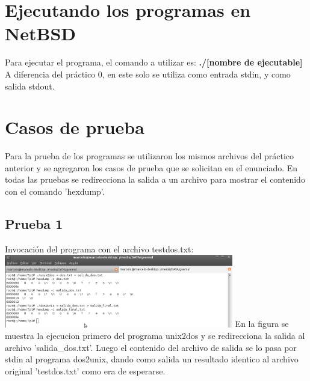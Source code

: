 \documentclass[a4paper,10pt]{article}
\begin{document}
\section{Ejecutando los programas en NetBSD}
  Para ejecutar el programa, el comando a utilizar es:
  \newline
  {\bf ./[nombre de ejecutable]}
  \newline
  A diferencia del pr\'actico 0, en este solo se utiliza como entrada stdin, y como salida stdout.

\section{Casos de prueba}
  Para la prueba de los programas se utilizaron los mismos archivos del pr\'actico anterior y se agregaron los casos de prueba que
  se solicitan en el enunciado. En todas las pruebas se redirecciona la salida a un archivo para mostrar el contenido con el comando 'hexdump'.
    \subsection{Prueba 1}
    Invocaci\'on del programa con el archivo testdos.txt:
      \newline	
      \includegraphics[width=10cm, viewport=0 0 1018 324]{Imagenes/testdos.png}
      \newline
      En la figura se muestra la ejecucion primero del programa unix2dos y se redirecciona la salida al archivo 'salida\_dos.txt'. Luego el contenido
      del archivo de salida se lo pasa por stdin al programa dos2unix, dando como salida un resultado identico al archivo original 'testdos.txt' como era 
	de esperarse. 
      \newline
\end{document}
